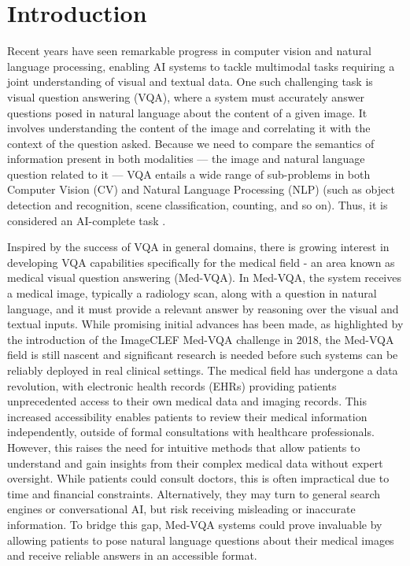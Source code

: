 \documentclass[pdflatex,sn-mathphys-num]{sn-jnl}%
\begin{document}
\maketitle
\section{Introduction}\label{sec1}

Recent years have seen remarkable progress in computer vision and natural language processing, enabling AI systems to tackle multimodal tasks requiring a joint understanding of visual and textual data. One such challenging task is visual question answering (VQA), where a system must accurately answer questions posed in natural language about the content of a given image. It involves understanding the content of the image and correlating it with the context of the question asked. Because we need to compare the semantics of information present in both modalities — the image and natural language question related to it — VQA entails a wide range of sub-problems in both Computer Vision (CV) and Natural Language Processing (NLP) (such as object detection and recognition, scene classification, counting, and so on). Thus, it is considered an AI-complete task \cite{sahu2022vqa}.

Inspired by the success of VQA in general domains, there is growing interest in developing VQA capabilities specifically for the medical field - an area known as medical visual question answering (Med-VQA). In Med-VQA, the system receives a medical image, typically a radiology scan, along with a question in natural language, and it must provide a relevant answer by reasoning over the visual and textual inputs. While promising initial advances has been made, as highlighted by the introduction of the ImageCLEF\cite{ImageCLEFVQA-Med2019} Med-VQA challenge in 2018, the Med-VQA field is still nascent and significant research is needed before such systems can be reliably deployed in real clinical settings.
The medical field has undergone a data revolution, with electronic health records (EHRs) providing patients unprecedented access to their own medical data and imaging records. This increased accessibility enables patients to review their medical information independently, outside of formal consultations with healthcare professionals. However, this raises the need for intuitive methods that allow patients to understand and gain insights from their complex medical data without expert oversight. While patients could consult doctors, this is often impractical due to time and financial constraints. Alternatively, they may turn to general search engines or conversational AI, but risk receiving misleading or inaccurate information. To bridge this gap, Med-VQA systems could prove invaluable by allowing patients to pose natural language questions about their medical images and receive reliable answers in an accessible format.
\end{document}
